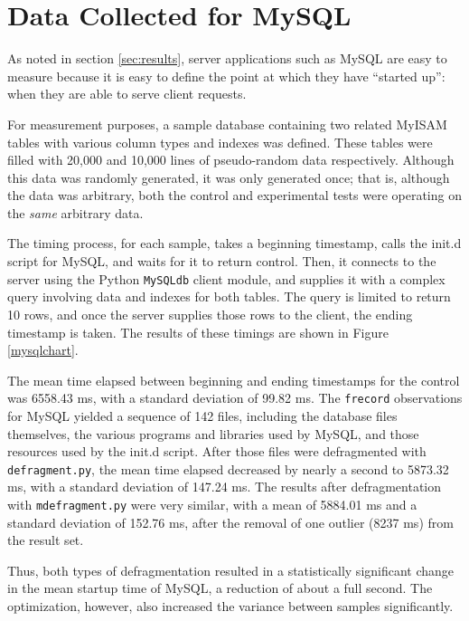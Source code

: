 \documentclass[10pt,twocolumn,letterpaper]{article}
\begin{document}
\section{Data Collected for MySQL}

As noted in section \ref{sec:results}, server applications such as MySQL are easy to measure because it is easy to define the point at which they have ``started up'': when they are able to serve client requests.

For measurement purposes, a sample database containing two related MyISAM tables with various column types and indexes was defined. These tables were filled with 20,000 and 10,000 lines of pseudo-random data respectively. Although this data was randomly generated, it was only generated once; that is, although the data was arbitrary, both the control and experimental tests were operating on the \emph{same} arbitrary data.

The timing process, for each sample, takes a beginning timestamp, calls the init.d script for MySQL, and waits for it to return control. Then, it connects to the server using the Python \texttt{MySQLdb} client module, and supplies it with a complex query involving data and indexes for both tables. The query is limited to return 10 rows, and once the
server supplies those rows to the client, the ending timestamp is taken. The results of these timings are shown in Figure \ref{mysqlchart}.

The mean time elapsed between beginning and ending timestamps for the control was 6558.43 ms, with a standard deviation of 99.82 ms. The \texttt{frecord} observations for MySQL yielded a sequence of 142 files, including the database files themselves, the various programs and libraries used by MySQL, and those resources used by the init.d script. After those files were defragmented with \texttt{defragment.py}, the mean time elapsed decreased by nearly a second to 5873.32 ms, with a standard deviation of 147.24 ms. The results after defragmentation with \texttt{mdefragment.py} were very similar, with a mean of 5884.01 ms and a standard deviation of 152.76 ms, after the removal of one outlier (8237 ms) from the result set.

Thus, both types of defragmentation resulted in a statistically significant change in the mean startup time of MySQL, a reduction of about a full second. The optimization, however, also increased the variance between samples significantly.
\end{document}
